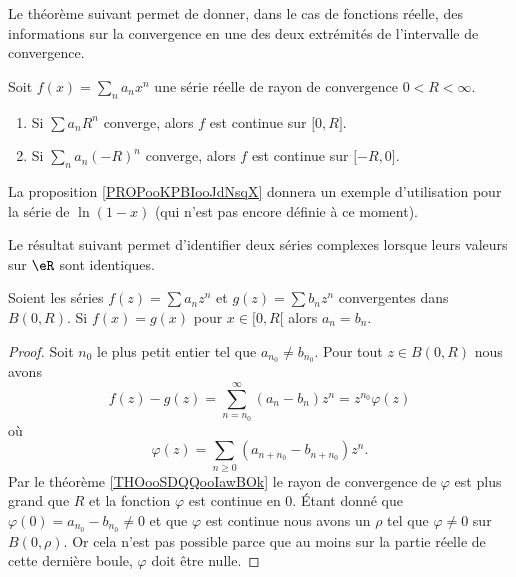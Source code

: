 Le théorème suivant permet de donner, dans le cas de fonctions réelle, des informations sur la convergence en une des deux extrémités de l'intervalle de convergence.
\begin{theorem} \label{ThoLUXVjs}
    Soit \( f(x)=\sum_na_nx^n\) une série réelle de rayon de convergence \( 0<R<\infty\).
    \begin{enumerate}
        \item
            Si \( \sum a_nR^n\) converge, alors \( f\) est continue sur \( \mathopen[ 0 , R \mathclose]\).
        \item
            Si \( \sum_na_n(-R)^n\) converge, alors \( f\) est continue sur \( \mathopen[ -R , 0 \mathclose]\).
    \end{enumerate}
\end{theorem}

La proposition \ref{PROPooKPBIooJdNsqX} donnera un exemple d'utilisation pour la série de \( \ln(1-x)\) (qui n'est pas encore définie à ce moment).


Le résultat suivant permet d'identifier deux séries complexes lorsque leurs valeurs sur \( \eR\) sont identiques.
\begin{proposition}
    Soient les séries \( f(z)=\sum a_nz^n\) et \( g(z)=\sum b_n z^n\) convergentes dans \( B(0,R)\). Si \( f(x)=g(x)\) pour \( x\in \mathopen[ 0 , R [\) alors \( a_n=b_n\).
\end{proposition}

\begin{proof}
    Soit \( n_0\) le plus petit entier tel que \( a_{n_0}\neq b_{n_0}\). Pour tout \( z\in B(0,R)\) nous avons
    \begin{equation}
        f(z)-g(z)=\sum_{n=n_0}^{\infty}(a_n-b_n)z^n=z^{n_0}\varphi(z)
    \end{equation}
    où
    \begin{equation}
        \varphi(z)=\sum_{n\geq 0}(a_{n+n_0}-b_{n+n_0})z^n.
    \end{equation}
    Par le théorème \ref{THOooSDQQooIawBOk} le rayon de convergence de \( \varphi\) est plus grand que \( R\) et la fonction \( \varphi\) est continue en \( 0\). Étant donné que \( \varphi(0)=a_{n_0}-b_{n_0}\neq 0\) et que \( \varphi\) est continue nous avons un \( \rho\) tel que \( \varphi\neq 0\) sur \( B(0,\rho)\). Or cela n'est pas possible parce que au moins sur la partie réelle de cette dernière boule, \( \varphi\) doit être nulle.
\end{proof}

